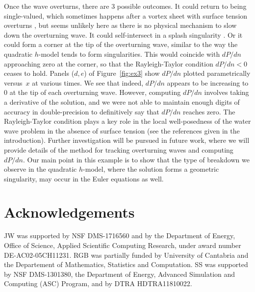 \documentclass[11pt]{article}
\theoremstyle{plain}
\theoremstyle{definition}
\theoremstyle{definition}
\begin{document}
Once the wave overturns, there are 3 possible outcomes. It could
return to being single-valued, which sometimes happens after a vortex
sheet with surface tension overturns
\cite{ambrose-wilkening:vortex-sheet-2010,ambrose-wilkening:vortex-sheet-2014},
but seems unlikely here as there is no physical mechanism to slow down
the overturning wave.  It could self-intersect in a splash singularity
\cite{castro2012splash,coutand2014finite}. Or it could form a corner
at the tip of the overturning wave, similar to the way the quadratic
$h$-model tends to form singularities. This would coincide with
$dP/dn$ approaching zero at the corner, so that the Rayleigh-Taylor condition
$dP/dn<0$ ceases to hold.  Panels ($d,e$) of Figure~\ref{fig:ex3} show
$dP/dn$ plotted parametrically versus~$x$ at various times. We see
that indeed, $dP/dn$ appears to be increasing to 0 at the tip of each
overturning wave. However, computing $dP/dn$ involves taking a
derivative of the solution, and we were not able to maintain enough
digits of accuracy in double-precision to definitively say that
$dP/dn$ reaches zero. The Rayleigh-Taylor condition plays a key role in the local well-posedness
of the water wave problem in the absence of
surface tension (see the references given in the introduction). 
Further
investigation will be pursued in future work, where we will provide
details of the method for tracking overturning waves and computing
$dP/dn$. Our main point in this example is to show that the type of
breakdown we observe in the quadratic $h$-model, where the
solution forms a geometric singularity, may occur in the Euler equations as well.

\section*{Acknowledgements}
JW was supported by  NSF
 DMS-1716560 and by the Department of Energy, Office of
Science, Applied Scientific Computing Research, under award number
DE-AC02-05CH11231. RGB was partially funded by University of Cantabria and the Departement of Mathematics, Statistics and Computation.
SS was supported by NSF DMS-1301380,  the Department of Energy, Advanced Simulation and Computing (ASC) Program, and
by  DTRA HDTRA11810022.


\appendix
\end{document}
